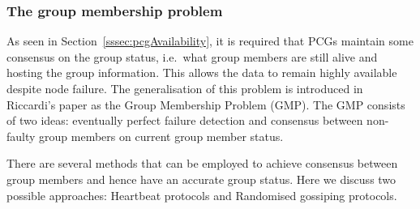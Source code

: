\subsubsection{The group membership problem}

As seen in Section~\ref{sssec:pcgAvailability}, it is required that PCGs maintain some consensus on the group status, i.e.\ what group members are still alive and hosting the group information. This allows the data to remain highly available despite node failure. The generalisation of this problem is introduced in Riccardi’s paper\cite{ricciardi1992gmp} as the Group Membership Problem (GMP). The GMP consists of two ideas: eventually perfect failure detection\cite{mostefaoui2003failure} and consensus\cite{barborak1993consensus} between non-faulty group members on current group member status\cite{bracha1985asynchronous}.

There are several methods that can be employed to achieve consensus between group members and hence have an accurate group status. Here we discuss two possible approaches: Heartbeat protocols and Randomised gossiping protocols.

